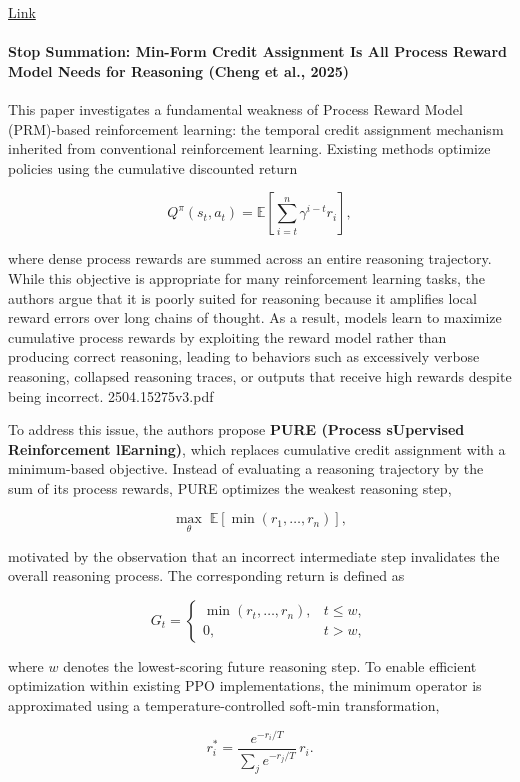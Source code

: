 \documentclass[11pt]{article}
\begin{document}
\href{https://arxiv.org/abs/2504.15275}{Link}
\paragraph{Stop Summation: Min-Form Credit Assignment Is All Process Reward Model Needs for Reasoning (Cheng et al., 2025)}

This paper investigates a fundamental weakness of Process Reward Model (PRM)-based reinforcement learning: the temporal credit assignment mechanism inherited from conventional reinforcement learning. Existing methods optimize policies using the cumulative discounted return

\[
Q^{\pi}(s_t,a_t)
=
\mathbb{E}
\left[
\sum_{i=t}^{n}
\gamma^{i-t}r_i
\right],
\]

where dense process rewards are summed across an entire reasoning trajectory. While this objective is appropriate for many reinforcement learning tasks, the authors argue that it is poorly suited for reasoning because it amplifies local reward errors over long chains of thought. As a result, models learn to maximize cumulative process rewards by exploiting the reward model rather than producing correct reasoning, leading to behaviors such as excessively verbose reasoning, collapsed reasoning traces, or outputs that receive high rewards despite being incorrect. 2504.15275v3.pdf

To address this issue, the authors propose \textbf{PURE (Process sUpervised Reinforcement lEarning)}, which replaces cumulative credit assignment with a minimum-based objective. Instead of evaluating a reasoning trajectory by the sum of its process rewards, PURE optimizes the weakest reasoning step,

\[
\max_\theta
\;
\mathbb{E}
\left[
\min(r_1,\ldots,r_n)
\right],
\]

motivated by the observation that an incorrect intermediate step invalidates the overall reasoning process. The corresponding return is defined as

\[
G_t=
\begin{cases}
\min(r_t,\ldots,r_n), & t\le w,\\
0, & t>w,
\end{cases}
\]

where \(w\) denotes the lowest-scoring future reasoning step. To enable efficient optimization within existing PPO implementations, the minimum operator is approximated using a temperature-controlled soft-min transformation,

\[
r_i^{*}
=
\frac{e^{-r_i/T}}
{\sum_j e^{-r_j/T}}
\,r_i.
\]
\end{document}
